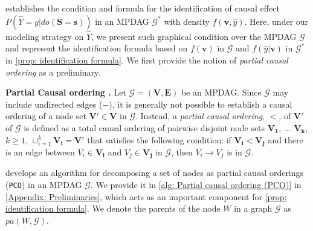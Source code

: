 \documentclass{article} %
\begin{document}

\citet[Theorem 3.6]{perkovic2020identifying} establishes the condition and formula for the identification of causal effect $P(\hat{Y}=y|do(\mathbf{S}=\mathbf{s}))$ in an MPDAG $\mathcal{G^*}$ with density $f(\mathbf{v}, \hat{y})$. Here, under our modeling strategy on $\hat{Y}$, we present such graphical condition over the MPDAG $\mathcal{G}$ and represent the identification formula based on $f(\mathbf{v})$ in $\mathcal{G}$ and $f(\hat{y}|\mathbf{v})$ in $\mathcal{G^*}$ in \cref{prop: identification formula}. We first provide the notion of \textit{partial causal ordering} as a preliminary.

\textbf{Partial Causal ordering \citet{perkovic2020identifying}.} 
Let $\mathcal{G}=(\mathbf{V}, \mathbf{E})$ be an MPDAG. Since $\mathcal{G}$ may include undirected edges ($-$), it is generally not possible to establish a causal ordering of a node set $\mathbf{V'} \in \mathbf{V}$ in $\mathcal{G}$. Instead, a \textit{partial causal ordering}, $<$, of $\mathbf{V'}$ of $\mathcal{G}$ is defined as a total causal ordering of pairwise disjoint node sets $\mathbf{V_1}$, ... $\mathbf{V_k}$, $k \ge 1$, $\cup^{k}_{i=1}{\mathbf{V_i}}=\mathbf{V'}$ that satisfies the following condition: if $\mathbf{V_i} < \mathbf{V_j}$ and there is an edge between $V_i \in \mathbf{V_i}$ and $V_j \in \mathbf{V_j}$ in $\mathcal{G}$, then $V_i \rightarrow V_j$ is in $\mathcal{G}$.

\citet{perkovic2020identifying} develops an algorithm for decomposing a set of nodes as partial causal orderings (\texttt{PCO}) in an MPDAG $\mathcal{G}$. We provide it in \cref{alg: Partial causal ordering (PCO)} in \cref{Appendix: Preliminaries}, which acts as an important component for \cref{prop: identification formula}. We denote the parents of the node $W$ in a graph $\mathcal{G}$ as $pa(W, \mathcal{G})$.
\end{document}
